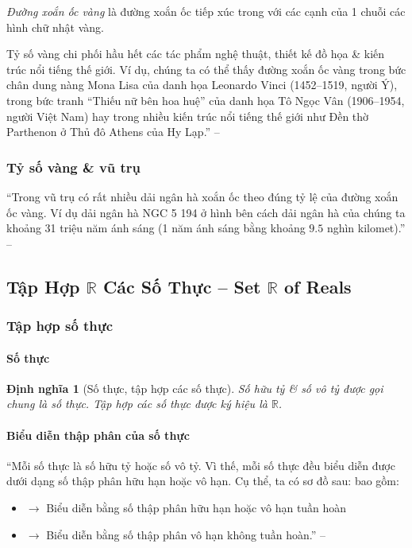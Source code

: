 \documentclass{article}
\numberwithin{equation}{section}
\newtheorem{dinhnghia}{Định nghĩa}[section]
\begin{document}
\textit{Đường xoắn ốc vàng} là đường xoắn ốc tiếp xúc trong với các cạnh của 1 chuỗi các hình chữ nhật vàng.

Tỷ số vàng chi phối hầu hết các tác phẩm nghệ thuật, thiết kế đồ họa \& kiến trúc nổi tiếng thế giới. Ví dụ, chúng ta có thể thấy đường xoắn ốc vàng trong bức chân dung nàng Mona Lisa của danh họa Leonardo Vinci (1452--1519, người Ý), trong bức tranh ``Thiếu nữ bên hoa huệ'' của danh họa Tô Ngọc Vân (1906--1954, người Việt Nam) hay trong nhiều kiến trúc nổi tiếng thế giới như Đền thờ Parthenon ở Thủ đô Athens của Hy Lạp.'' -- \cite[p. 36]{SGK_Toan_7_Canh_Dieu_tap_1}

\subsubsection{Tỷ số vàng \& vũ trụ}
``Trong vũ trụ có rất nhiều dải ngân hà xoắn ốc theo đúng tỷ lệ của đường xoắn ốc vàng. Ví dụ dải ngân hà NGC 5 194 ở hình bên cách dải ngân hà của chúng ta khoảng 31 triệu năm ánh sáng (1 năm ánh sáng bằng khoảng $9.5$ nghìn kilomet).'' -- \cite[p. 36]{SGK_Toan_7_Canh_Dieu_tap_1}

\subsection{Tập Hợp $\mathbb{R}$ Các Số Thực -- Set $\mathbb{R}$ of Reals}

\subsubsection{Tập hợp số thực}

\paragraph{Số thực}

\begin{dinhnghia}[Số thực, tập hợp các số thực]
	Số hữu tỷ \& số vô tỷ được gọi chung là \emph{số thực}. \emph{Tập hợp các số thực} được ký hiệu là $\mathbb{R}$.
\end{dinhnghia}

\paragraph{Biểu diễn thập phân của số thực}
``Mỗi số thực là số hữu tỷ hoặc số vô tỷ. Vì thế, mỗi số thực đều biểu diễn được dưới dạng số thập phân hữu hạn hoặc vô hạn. Cụ thể, ta có sơ đồ sau:  bao gồm:
\begin{itemize}
	\item {} $\to$ Biểu diễn bằng số thập phân hữu hạn hoặc vô hạn tuần hoàn
	\item {} $\to$ Biểu diễn bằng số thập phân vô hạn không tuần hoàn.'' -- \cite[p. 38]{SGK_Toan_7_Canh_Dieu_tap_1}
\end{itemize}
\end{document}
